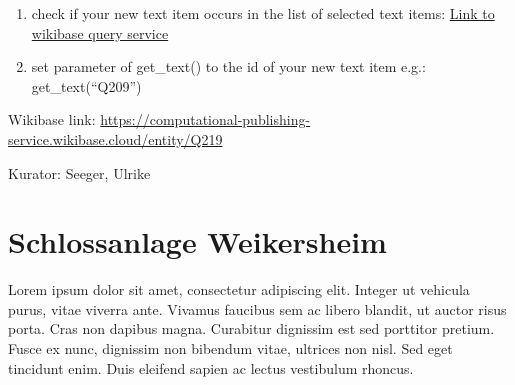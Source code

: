 \documentclass[
  letterpaper,
]{book}
\begin{document}
\begin{enumerate}
\def\labelenumi{\arabic{enumi}.}
\setcounter{enumi}{1}
\item
  check if your new text item occurs in the list of selected text items:
  \href{https://computational-publishing-service.wikibase.cloud/query/\#PREFIX\%20cps\%3A\%20\%3Chttps\%3A\%2F\%2Fcomputational-publishing-service.wikibase.cloud\%2Fentity\%2F\%3E\%0APREFIX\%20cpss\%3A\%20\%3Chttps\%3A\%2F\%2Fcomputational-publishing-service.wikibase.cloud\%2Fentity\%2Fstatement\%2F\%3E\%0APREFIX\%20cpsv\%3A\%20\%3Chttps\%3A\%2F\%2Fcomputational-publishing-service.wikibase.cloud\%2Fvalue\%2F\%3E\%0APREFIX\%20cpspt\%3A\%20\%3Chttps\%3A\%2F\%2Fcomputational-publishing-service.wikibase.cloud\%2Fprop\%2Fdirect\%2F\%3E\%0APREFIX\%20cpsp\%3A\%20\%3Chttps\%3A\%2F\%2Fcomputational-publishing-service.wikibase.cloud\%2Fprop\%2F\%3E\%0APREFIX\%20cpsps\%3A\%20\%3Chttps\%3A\%2F\%2Fcomputational-publishing-service.wikibase.cloud\%2Fprop\%2Fstatement\%2F\%3E\%0APREFIX\%20cpspq\%3A\%20\%3Chttps\%3A\%2F\%2Fcomputational-publishing-service.wikibase.cloud\%2Fprop\%2Fqualifier\%2F\%3E\%0A\%0ASELECT\%20\%3FtextItem\%20\%3FkuratorLabel\%20\%3FtextUrl\%0AWHERE\%0A\%7B\%0A\%20\%20\%3FtextItem\%20cpsp\%3AP46\%20\%3FkuratorStatement.\%20\%0A\%20\%20\%3FkuratorStatement\%20cpsps\%3AP46\%20\%3FkuratorItem.\%20\%0A\%20\%20\%3FkuratorItem\%20rdfs\%3Alabel\%20\%3FkuratorLabel.\%0A\%20\%20\%3FtextItem\%20cpsp\%3AP57\%20\%3Furlstatement.\%20\%0A\%20\%20\%3Furlstatement\%20cpsps\%3AP57\%20\%3FtextUrl.\%20\%0A\%7D}{Link
  to wikibase query service}
\item
  set parameter of get\_text() to the id of your new text item e.g.:
  get\_text(``Q209'')
\end{enumerate}

Wikibase link:
\url{https://computational-publishing-service.wikibase.cloud/entity/Q219}

Kurator: Seeger, Ulrike


\chapter{Schlossanlage Weikersheim}\label{schlossanlage-weikersheim}

Lorem ipsum dolor sit amet, consectetur adipiscing elit. Integer ut
vehicula purus, vitae viverra ante. Vivamus faucibus sem ac libero
blandit, ut auctor risus porta. Cras non dapibus magna. Curabitur
dignissim est sed porttitor pretium. Fusce ex nunc, dignissim non
bibendum vitae, ultrices non nisl. Sed eget tincidunt enim. Duis
eleifend sapien ac lectus vestibulum rhoncus.
\end{document}
